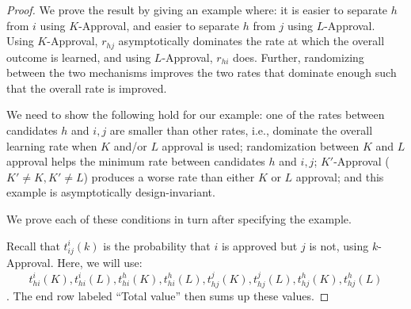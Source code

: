 \documentclass[10pt]{article}
\begin{document}
\begin{ReviewVerbatim}
\begin{proof}
	We prove the result by giving an example where: it is easier to separate $h$ from $i$ using $K$-Approval, and easier to separate $h$ from $j$ using $L$-Approval. Using $K$-Approval, $r_{hj}$ asymptotically dominates the rate at which the overall outcome is learned, and using $L$-Approval, $r_{hi}$ does. Further, randomizing between the two mechanisms improves the two rates that dominate enough such that the overall rate is improved.

	We need to show the following hold for our example: one of the rates between candidates $h$ and $i,j$ are smaller than other rates, i.e., dominate the overall learning rate when $K$ and/or $L$ approval is used; randomization between $K$ and $L$ approval helps the minimum rate between candidates $h$ and $i,j$; $K'$-Approval ($K'\neq K, K' \neq L$) produces a worse rate than either $K$ or $L$ approval; and this example is asymptotically design-invariant.

	We prove each of these conditions in turn after specifying the example.

	Recall that $t_{ij}^i(k)$ is the probability that $i$ is approved but $j$ is not, using $k$-Approval. Here, we will use:	 $$t_{hi}^i(K),t_{hi}^i(L),t_{hi}^h(K),t_{hi}^h(L),
	t_{hj}^j(K),t_{hj}^j(L),t_{hj}^h(K),t_{hj}^h(L)$$. The end row labeled ``Total value'' then sums up these values.


%

%


\end{proof}
\end{ReviewVerbatim}
\end{document}
